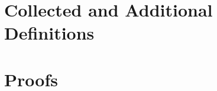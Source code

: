 \section{Collected and Additional Definitions}
\label{app:definitions}



\section{Proofs}
\label{app:proofs}






